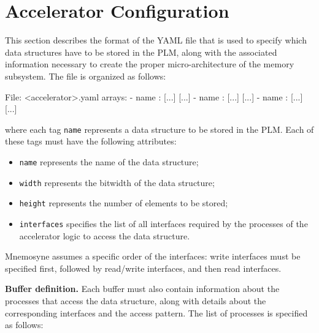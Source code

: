 \section{Accelerator Configuration}\label{sec:config}

This section describes the format of the YAML file that is used to specify which
data structures have to be stored in the PLM, along with the associated
information necessary to create the proper micro-architecture of the memory
subsystem. The file is organized as follows:
\begin{myxml}{File: <accelerator>.yaml}
arrays:
  - name       : [...]
    [...]
  - name       : [...]
    [...]
  - name       : [...]
    [...]
\end{myxml}
\noindent where each tag {\tt name} represents a data structure to be stored in the PLM.
Each of these tags must have the following attributes:
\begin{itemize}
\item {\tt name} represents the name of the data structure;
\item {\tt width} represents the bitwidth of the data structure;
\item {\tt height} represents the number of elements to be stored;
\item {\tt interfaces} specifies the list of all interfaces required by the processes of the accelerator logic to access the data structure. 
\end{itemize}

\begin{lattention}
{\sc Mnemosyne} assumes a specific order of the interfaces: write interfaces must be specified
first, followed by read/write interfaces, and then read interfaces.
\end{lattention}

\vspace{4pt}
{\bf Buffer definition.}
Each buffer must also contain information about the processes that
access the data structure, along with details about the corresponding interfaces
and the access pattern. The list of processes is specified as follows:

